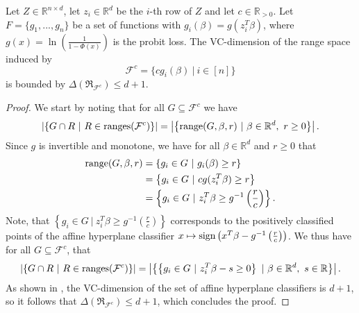 \begin{lemma}
    \label{lemma:vcdim-constant}
    Let $Z \in \mathbb{R}^{n \times d}$, let $z_i \in \mathbb{R}^d$ be the
    $i$-th row of $Z$ and let $c \in \mathbb{R}_{>0}$.
    Let $F = \{g_1, ..., g_n\}$ be a set of functions with
    $g_i(\beta) = g(z_i^T \beta)$, where
    $g(x) = \ln\left(\frac{1}{1 - \Phi(x)}\right)$ is the
    probit loss.
    The VC-dimension of the range space induced by
    \begin{equation*}
        \mathcal{F}^c = \{ c g_i(\beta) \ | \ i \in [n] \}
    \end{equation*}
    is bounded by $\Delta(\mathfrak{R}_{\mathcal{F}^c}) \leq d + 1$.
\end{lemma}
\begin{proof}
    We start by noting that for all $G \subseteq \mathcal{F}^c$ we have
    \begin{equation*}
        \left| \left\{ G \cap R \ | \
        R \in \textup{ranges}(\mathcal{F}^c) \right\} \right|
        =
        \left| \left\{ \textup{range}(G, \beta, r) \ | \
        \beta \in \mathbb{R}^d, \ r \geq 0 \right\} \right|.
    \end{equation*}
    Since $g$ is invertible and monotone, we have for all
    $\beta \in \mathbb{R}^d$ and $r \geq 0$ that
    \begin{align*}
        \textup{range}(G, \beta, r)
         & = \left\{ g_i \in G \ |\ g_i(\beta) \geq r \right\}                                   \\
         & = \left\{ g_i \in G \ |\ c g(z_i^T \beta) \geq r \right\}                             \\
         & = \left\{ g_i \in G \ |\ z_i^T \beta \geq g^{-1} \left( \frac{r}{c} \right) \right\}.
    \end{align*}
    Note, that $\left\{ g_i \in G
        \ |\ z_i^T \beta \geq g^{-1} \left( \frac{r}{c} \right) \right\}$
    corresponds to the positively classified points of the
    affine hyperplane classifier
    $x \mapsto \textup{sign}\left(
        x^T\beta - g^{-1}\left(\frac{r}{c}\right) \right)$.
    We thus have for all $G \subseteq \mathcal{F}^c$, that
    \begin{equation*}
        \left| \left\{ G \cap R \ | \
        R \in \textup{ranges}(\mathcal{F}^c) \right\} \right|
        =
        \left| \left\{ \left\{ g_i \in G
        \ |\ z_i^T \beta - s \geq 0 \right\} \ | \
        \beta \in \mathbb{R}^d, \ s \in \mathbb{R} \right\} \right|.
    \end{equation*}
    As shown in \cite{computational-learning-theory}, the VC-dimension
    of the set of affine hyperplane classifiers is
    $d+1$, so it follows that
    $\Delta(\mathfrak{R}_{\mathcal{F}^c}) \leq d + 1$,
    which concludes the proof.
\end{proof}

